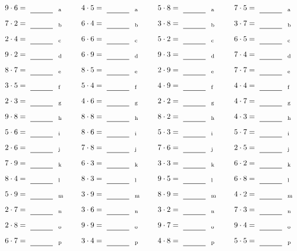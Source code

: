 \documentclass
[
  draft    = true,
  fontsize = 11pt,
  parskip  = half-
]
{scrartcl}
\begin{document}
\par\vfill\par
\begin{align*}
    \pline{9\cdot6}&=\rline{a}
  & \pline{4\cdot5}&=\rline{a}
  & \pline{5\cdot8}&=\rline{a}
  & \pline{7\cdot5}&=\rline{a} \\[1ex]
    \pline{7\cdot2}&=\rline{b}
  & \pline{6\cdot4}&=\rline{b}
  & \pline{3\cdot8}&=\rline{b}
  & \pline{3\cdot7}&=\rline{b} \\[1ex]
    \pline{2\cdot4}&=\rline{c}
  & \pline{6\cdot6}&=\rline{c}
  & \pline{5\cdot2}&=\rline{c}
  & \pline{6\cdot5}&=\rline{c} \\[1ex]
    \pline{9\cdot2}&=\rline{d}
  & \pline{6\cdot9}&=\rline{d}
  & \pline{9\cdot3}&=\rline{d}
  & \pline{7\cdot4}&=\rline{d} \\[1ex]
    \pline{8\cdot7}&=\rline{e}
  & \pline{8\cdot5}&=\rline{e}
  & \pline{2\cdot9}&=\rline{e}
  & \pline{7\cdot7}&=\rline{e} \\[1ex]
    \pline{3\cdot5}&=\rline{f}
  & \pline{5\cdot4}&=\rline{f}
  & \pline{4\cdot9}&=\rline{f}
  & \pline{4\cdot4}&=\rline{f} \\[1ex]
    \pline{2\cdot3}&=\rline{g}
  & \pline{4\cdot6}&=\rline{g}
  & \pline{2\cdot2}&=\rline{g}
  & \pline{4\cdot7}&=\rline{g} \\[1ex]
    \pline{9\cdot8}&=\rline{h}
  & \pline{8\cdot8}&=\rline{h}
  & \pline{8\cdot2}&=\rline{h}
  & \pline{4\cdot3}&=\rline{h} \\[1ex]
    \pline{5\cdot6}&=\rline{i}
  & \pline{8\cdot6}&=\rline{i}
  & \pline{5\cdot3}&=\rline{i}
  & \pline{5\cdot7}&=\rline{i} \\[1ex]
    \pline{2\cdot6}&=\rline{j}
  & \pline{7\cdot8}&=\rline{j}
  & \pline{7\cdot6}&=\rline{j}
  & \pline{2\cdot5}&=\rline{j} \\[1ex]
    \pline{7\cdot9}&=\rline{k}
  & \pline{6\cdot3}&=\rline{k}
  & \pline{3\cdot3}&=\rline{k}
  & \pline{6\cdot2}&=\rline{k} \\[1ex]
    \pline{8\cdot4}&=\rline{l}
  & \pline{8\cdot3}&=\rline{l}
  & \pline{9\cdot5}&=\rline{l}
  & \pline{6\cdot8}&=\rline{l} \\[1ex]
    \pline{5\cdot9}&=\rline{m}
  & \pline{3\cdot9}&=\rline{m}
  & \pline{8\cdot9}&=\rline{m}
  & \pline{4\cdot2}&=\rline{m} \\[1ex]
    \pline{2\cdot7}&=\rline{n}
  & \pline{3\cdot6}&=\rline{n}
  & \pline{3\cdot2}&=\rline{n}
  & \pline{7\cdot3}&=\rline{n} \\[1ex]
    \pline{2\cdot8}&=\rline{o}
  & \pline{9\cdot9}&=\rline{o}
  & \pline{9\cdot7}&=\rline{o}
  & \pline{9\cdot4}&=\rline{o} \\[1ex]
    \pline{6\cdot7}&=\rline{p}
  & \pline{3\cdot4}&=\rline{p}
  & \pline{4\cdot8}&=\rline{p}
  & \pline{5\cdot5}&=\rline{p}
\end{align*}
\end{document}

